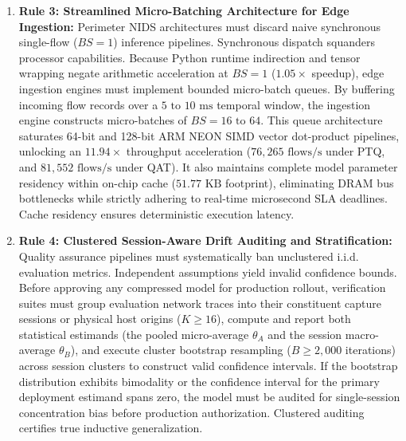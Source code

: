 \documentclass[conference]{IEEEtran}
\begin{document}
\begin{enumerate}
    \item \textbf{Rule 3: Streamlined Micro-Batching Architecture for Edge Ingestion:} Perimeter NIDS architectures must discard naive synchronous single-flow ($BS = 1$) inference pipelines. Synchronous dispatch squanders processor capabilities. Because Python runtime indirection and tensor wrapping negate arithmetic acceleration at $BS = 1$ ($1.05\times$ speedup), edge ingestion engines must implement bounded micro-batch queues. By buffering incoming flow records over a $5\text{ to }10\text{ ms}$ temporal window, the ingestion engine constructs micro-batches of $BS = 16\text{ to }64$. This queue architecture saturates 64-bit and 128-bit ARM NEON SIMD vector dot-product pipelines, unlocking an $11.94\times$ throughput acceleration ($76,265\text{ flows/s}$ under PTQ, and $81,552\text{ flows/s}$ under QAT). It also maintains complete model parameter residency within on-chip cache ($51.77\text{ KB}$ footprint), eliminating DRAM bus bottlenecks while strictly adhering to real-time microsecond SLA deadlines. Cache residency ensures deterministic execution latency.
    \item \textbf{Rule 4: Clustered Session-Aware Drift Auditing and Stratification:} Quality assurance pipelines must systematically ban unclustered i.i.d. evaluation metrics. Independent assumptions yield invalid confidence bounds. Before approving any compressed model for production rollout, verification suites must group evaluation network traces into their constituent capture sessions or physical host origins ($K \ge 16$), compute and report both statistical estimands (the pooled micro-average $\theta_A$ and the session macro-average $\theta_B$), and execute cluster bootstrap resampling ($B \ge 2,000$ iterations) across session clusters to construct valid confidence intervals. If the bootstrap distribution exhibits bimodality or the confidence interval for the primary deployment estimand spans zero, the model must be audited for single-session concentration bias before production authorization. Clustered auditing certifies true inductive generalization.
\end{enumerate}
\end{document}
